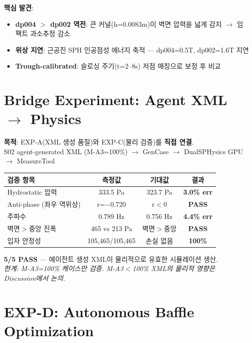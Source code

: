 \documentclass[10pt,a4paper]{article}
\begin{document}
\textbf{핵심 발견}:
\begin{itemize}[nosep,leftmargin=1.5em]
\item \textbf{dp004 $>$ dp002 역전}: 큰 커널(h=0.0083m)이 벽면 압력을 넓게 감지 $\rightarrow$ 임팩트 과소추정 감소
\item \textbf{위상 지연}: 근공진 SPH 인공점성 에너지 축적 — dp004=0.5T, dp002=1.6T 지연
\item \textbf{Trough-calibrated}: 슬로싱 주기(t=2--8s) 저점 매칭으로 보정 후 비교
\end{itemize}

\section{Bridge Experiment: Agent XML $\rightarrow$ Physics}

\textbf{목적}: EXP-A(XML 생성 품질)와 EXP-C(물리 검증)를 \textbf{직접 연결}.\\
S02 agent-generated XML (M-A3=100\%) $\rightarrow$ GenCase $\rightarrow$ DualSPHysics GPU $\rightarrow$ MeasureTool

\begin{center}
\renewcommand{\arraystretch}{1.2}
\begin{tabular}{lccc}
\toprule
검증 항목 & 측정값 & 기대값 & 결과 \\
\midrule
Hydrostatic 압력 & 333.5 Pa & 323.7 Pa & \textcolor{pass}{\textbf{3.0\% err}} \\
Anti-phase (좌우 역위상) & r=$-$0.720 & r$<$0 & \textcolor{pass}{\textbf{PASS}} \\
주파수 & 0.789 Hz & 0.756 Hz & \textcolor{pass}{\textbf{4.4\% err}} \\
벽면$>$중앙 진폭 & 465 vs 213 Pa & 벽면$>$중앙 & \textcolor{pass}{\textbf{PASS}} \\
입자 안정성 & 105,465/105,465 & 손실 없음 & \textcolor{pass}{\textbf{100\%}} \\
\bottomrule
\end{tabular}
\end{center}

\textbf{5/5 PASS} — 에이전트 생성 XML이 물리적으로 유효한 시뮬레이션 생산.\\
\textit{한계: M-A3=100\% 케이스만 검증. M-A3$<$100\% XML의 물리적 영향은 Discussion에서 논의.}

\section{EXP-D: Autonomous Baffle Optimization}
\end{document}
